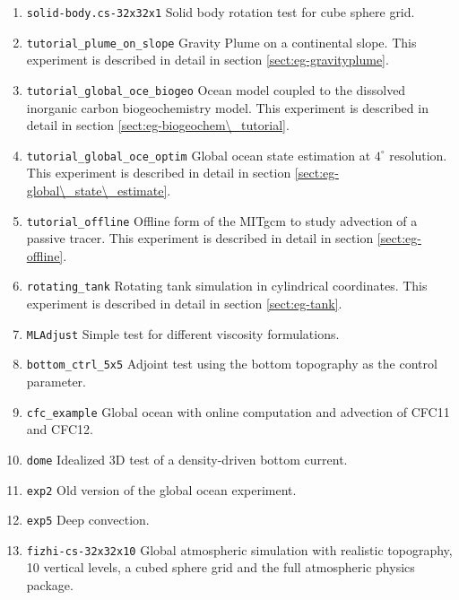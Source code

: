 \begin{enumerate}
\item \texttt{solid-body.cs-32x32x1} Solid body rotation test for cube
  sphere grid.

\item \texttt{tutorial\_plume\_on\_slope} Gravity Plume on a continental slope.
  This experiment is described in detail in section \ref{sect:eg-gravityplume}.

\item \texttt{tutorial\_global\_oce\_biogeo} Ocean model coupled to the dissolved 
  inorganic carbon biogeochemistry model. This experiment is described in detail in section
  \ref{sect:eg-biogeochem\_tutorial}.

\item \texttt{tutorial\_global\_oce\_optim} Global ocean state estimation at $4^\circ$ resolution.
  This experiment is described in detail in section \ref{sect:eg-global\_state\_estimate}.

\item \texttt{tutorial\_offline} Offline form of the MITgcm to study advection of a passive 
  tracer.  This experiment is described in detail in section \ref{sect:eg-offline}.

\item \texttt{rotating\_tank} Rotating tank simulation in cylindrical coordinates.
  This experiment is described in detail in section \ref{sect:eg-tank}.

\item \texttt{MLAdjust} Simple test for different viscosity formulations.

\item \texttt{bottom_ctrl_5x5} Adjoint test using the bottom topography as the
  control parameter.

\item \texttt{cfc_example} Global ocean with online computation and advection of
CFC11 and CFC12.

\item \texttt{dome} Idealized 3D test of a density-driven bottom current.

\item \texttt{exp2} Old version of the global ocean experiment.

\item \texttt{exp5} Deep convection.

\item \texttt{fizhi-cs-32x32x10} Global atmospheric simulation with realistic topography,
  10 vertical levels, a cubed sphere grid and the full atmospheric physics package.


\end{enumerate}
